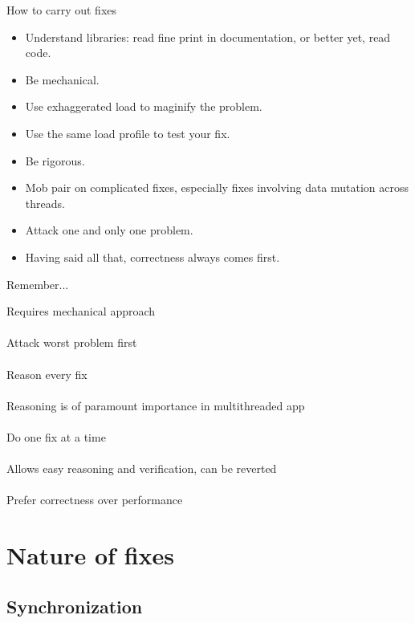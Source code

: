 \documentclass{beamer}
\begin{document}
\begin{frame}{How to carry out fixes}
  \begin{itemize}
  \item Understand libraries: read fine print in documentation, or better yet, read code.
    \pause
  \item Be mechanical.
    \pause
  \item Use exhaggerated load to maginify the problem.
    \pause
  \item Use the same load profile to test your fix.
    \pause
  \item Be rigorous.
    \pause
  \item Mob pair on complicated fixes, especially fixes involving data mutation across threads.
    \pause
  \item Attack one and only one problem.
    \pause
  \item Having said all that, correctness always comes first.
  \end{itemize}
\end{frame}

\begin{frame}{Remember...}
  \begin{center}
    \large{Requires mechanical approach}\quad\\
    \quad\\
    \small{Attack worst problem first}\quad\\
    \quad\\
    \large{Reason every fix}\quad\\
    \quad\\
    \small{Reasoning is of paramount importance in multithreaded app}\quad\\
    \quad\\
    \large{Do one fix at a time}\quad\\
    \quad\\
    \small{Allows easy reasoning and verification, can be reverted}\quad\\
    \quad\\
    \large{Prefer correctness over performance}
  \end{center}
\end{frame}

\section{Nature of fixes}

\subsection{Synchronization}
\end{document}
